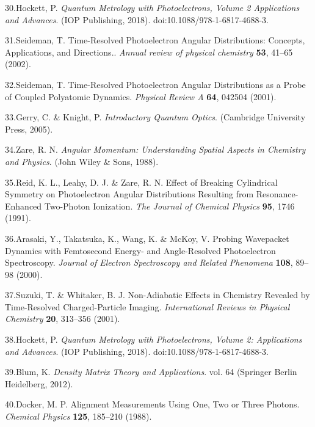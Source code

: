 \documentclass[10pt]{article}
\begin{document}
\label{csl:30}30.Hockett, P. \textit{{Quantum {{Metrology}} with {{Photoelectrons}}, {{Volume}} 2 {{Applications}} and Advances}}. ({IOP Publishing}, 2018). doi:10.1088/978-1-6817-4688-3.

\label{csl:31}31.Seideman, T. {Time-Resolved Photoelectron Angular Distributions: Concepts, Applications, and Directions.}. \textit{Annual review of physical chemistry} \textbf{53}, 41–65 (2002).

\label{csl:32}32.Seideman, T. {Time-Resolved Photoelectron Angular Distributions as a Probe of Coupled Polyatomic Dynamics}. \textit{Physical Review A} \textbf{64}, 042504 (2001).

\label{csl:33}33.Gerry, C. \& Knight, P. \textit{{Introductory {{Quantum Optics}}}}. ({Cambridge University Press}, 2005).

\label{csl:34}34.Zare, R. N. \textit{{Angular {{Momentum}}: {{Understanding}} Spatial Aspects in Chemistry and Physics}}. ({John Wiley \& Sons}, 1988).

\label{csl:35}35.Reid, K. L., Leahy, D. J. \& Zare, R. N. {Effect of Breaking Cylindrical Symmetry on Photoelectron Angular Distributions Resulting from Resonance-Enhanced Two-Photon Ionization}. \textit{The Journal of Chemical Physics} \textbf{95}, 1746 (1991).

\label{csl:36}36.Arasaki, Y., Takatsuka, K., Wang, K. \& McKoy, V. {Probing Wavepacket Dynamics with Femtosecond Energy- and Angle-Resolved Photoelectron Spectroscopy}. \textit{Journal of Electron Spectroscopy and Related Phenomena} \textbf{108}, 89–98 (2000).

\label{csl:37}37.Suzuki, T. \& Whitaker, B. J. {Non-Adiabatic Effects in Chemistry Revealed by Time-Resolved Charged-Particle Imaging}. \textit{International Reviews in Physical Chemistry} \textbf{20}, 313–356 (2001).

\label{csl:38}38.Hockett, P. \textit{{Quantum {{Metrology}} with {{Photoelectrons}}, {{Volume}} 2: {{Applications}} and Advances}}. ({IOP Publishing}, 2018). doi:10.1088/978-1-6817-4688-3.

\label{csl:39}39.Blum, K. \textit{{Density {{Matrix Theory}} and {{Applications}}}}. vol. 64 ({Springer Berlin Heidelberg}, 2012).

\label{csl:40}40.Docker, M. P. {Alignment Measurements Using One, Two or Three Photons}. \textit{Chemical Physics} \textbf{125}, 185–210 (1988).
\end{document}
